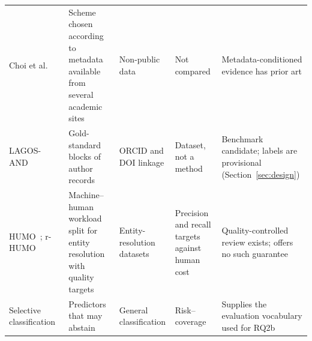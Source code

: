 \begin{table}[t]
\begin{tabular}{@{}p{}p{}p{}p{}p{}@{}}
Choi et al.~\cite{choi2024heterogeneoussites} & Scheme chosen according to metadata available from several academic sites & Non-public data & Not compared & Metadata-conditioned evidence has prior art \\
LAGOS-AND~\cite{zhang2023lagosand,zhang2022lagosandv2} & Gold-standard blocks of author records & ORCID and DOI linkage & Dataset, not a method & Benchmark candidate; labels are provisional (Section~\ref{sec:design}) \\
HUMO~\cite{chen2018humo}; r-HUMO~\cite{hou2020rhumo} & Machine--human workload split for entity resolution with quality targets & Entity-resolution datasets & Precision and recall targets against human cost & Quality-controlled review exists; \hammer{} offers no such guarantee \\
Selective classification~\cite{chow1970reject,elyaniv2010foundations,geifman2019selectivenet} & Predictors that may abstain & General classification & Risk--coverage & Supplies the evaluation vocabulary used for RQ2b \\
\bottomrule
\end{tabular}
\end{table}
